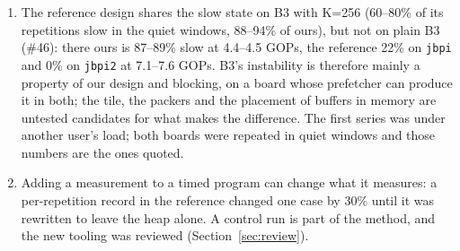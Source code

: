 \documentclass[11pt,a4paper]{article}
\begin{document}
\begin{enumerate}
  packed; the switch point looks like a chance event.
  \item The reference design shares the slow state on B3 with K=256 (60--80\% of its repetitions slow in the quiet windows, 88--94\% of ours), but not on plain B3
  (\#46): there ours is 87--89\% slow at 4.4--4.5 GOPs, the reference 22\% on \texttt{jbpi} and 0\% on \texttt{jbpi2} at 7.1--7.6 GOPs. B3's instability is therefore
  mainly a property of our design and blocking, on a board whose prefetcher can produce it in both; the tile, the packers and the placement of buffers in
  memory are untested candidates for what makes the difference. The first series was under another user's load; both boards were repeated in quiet windows and
  those numbers are the ones quoted.
  \item Adding a measurement to a timed program can change what it measures: a per-repetition record in the reference changed one case by 30\%
  until it was rewritten to leave the heap alone. A control run is part of the method, and the new tooling was reviewed (Section~\ref{sec:review}).
\end{enumerate}

\end{document}
